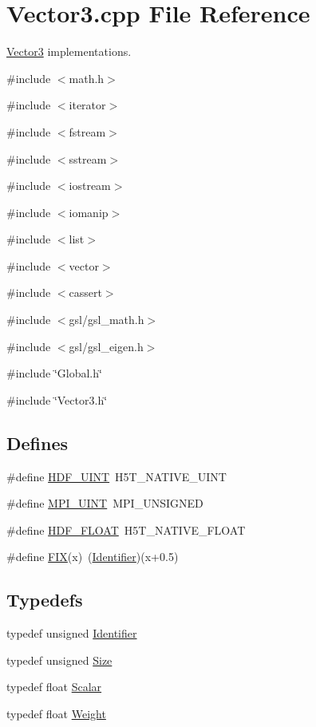 \section{Vector3.cpp File Reference}
\label{Vector3_8cpp}


\hyperlink{classVector3}{Vector3} implementations.  


{\ttfamily \#include $<$math.h$>$}\par
{\ttfamily \#include $<$iterator$>$}\par
{\ttfamily \#include $<$fstream$>$}\par
{\ttfamily \#include $<$sstream$>$}\par
{\ttfamily \#include $<$iostream$>$}\par
{\ttfamily \#include $<$iomanip$>$}\par
{\ttfamily \#include $<$list$>$}\par
{\ttfamily \#include $<$vector$>$}\par
{\ttfamily \#include $<$cassert$>$}\par
{\ttfamily \#include $<$gsl/gsl\_\-math.h$>$}\par
{\ttfamily \#include $<$gsl/gsl\_\-eigen.h$>$}\par
{\ttfamily \#include \char`\"{}Global.h\char`\"{}}\par
{\ttfamily \#include \char`\"{}Vector3.h\char`\"{}}\par
\subsection*{Defines}
\begin{DoxyCompactItemize}
\item 
\#define \hyperlink{Vector3_8cpp_ac366362734c04742f3c0777e399648af}{HDF\_\-UINT}~H5T\_\-NATIVE\_\-UINT
\item 
\#define \hyperlink{Vector3_8cpp_a36f55c7359c730c7b6be07a113c6af7b}{MPI\_\-UINT}~MPI\_\-UNSIGNED
\item 
\#define \hyperlink{Vector3_8cpp_a669eec24b7fa0bce364dc2d08724da7b}{HDF\_\-FLOAT}~H5T\_\-NATIVE\_\-FLOAT
\item 
\#define \hyperlink{Vector3_8cpp_a740431a9a1d25e39e670cd5f48454ce4}{FIX}(x)~(\hyperlink{Vector3_8h_a25e0b8ddd193bb84ebf6c0eeff6b1c82}{Identifier})(x+0.5)
\end{DoxyCompactItemize}
\subsection*{Typedefs}
\begin{DoxyCompactItemize}
\item 
typedef unsigned \hyperlink{Vector3_8cpp_a25e0b8ddd193bb84ebf6c0eeff6b1c82}{Identifier}
\item 
typedef unsigned \hyperlink{Vector3_8cpp_a772b762114e74538c967388931c4a5e9}{Size}
\item 
typedef float \hyperlink{Vector3_8cpp_aacf5954d048aaaaef04620896706921d}{Scalar}
\item 
typedef float \hyperlink{Vector3_8cpp_ad8909b856fa70c7731c787994276fb03}{Weight}
\end{DoxyCompactItemize}
